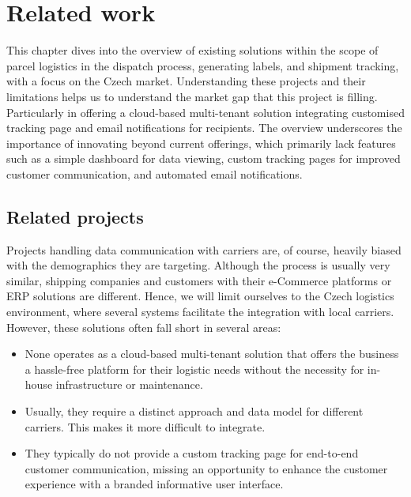 \chapter{Related work}
\label{chap:related-work}
This chapter dives into the overview of existing solutions within the scope of parcel logistics in the dispatch process, generating labels, and shipment tracking, with a focus on the Czech market.
Understanding these projects and their limitations helps us to understand the market gap that this project is filling.
Particularly in offering a cloud-based multi-tenant solution integrating customised tracking page and email notifications for recipients.
The overview underscores the importance of innovating beyond current offerings, which primarily lack features such as a simple dashboard for data viewing, custom tracking pages for improved customer communication, and automated email notifications.

\section{Related projects}
\label{sec:related-projects}

Projects handling data communication with carriers are, of course, heavily biased with the demographics they are targeting. 
Although the process is usually very similar, shipping companies and customers with their e-Commerce platforms or ERP solutions are different.
Hence, we will limit ourselves to the Czech logistics environment, where several systems facilitate the integration with local carriers. However, these solutions often fall short in several areas:
\begin{itemize}
    \item None operates as a cloud-based multi-tenant solution that offers the business a hassle-free platform for their logistic needs without the necessity for in-house infrastructure or maintenance.
    \item Usually, they require a distinct approach and data model for different carriers. This makes it more difficult to integrate.
    \item They typically do not provide a custom tracking page for end-to-end customer communication, missing an opportunity to enhance the customer experience with a branded informative user interface.
\end{itemize}

